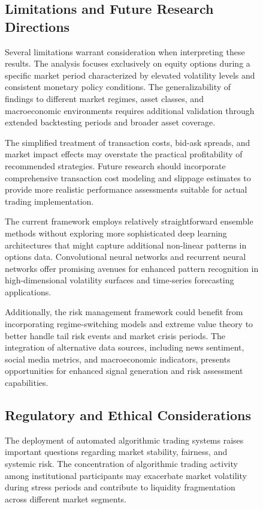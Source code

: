 \documentclass[12pt,a4paper]{article}
\begin{document}
\begin{figure}[H]
\subsection{Limitations and Future Research Directions}

Several limitations warrant consideration when interpreting these results. The analysis focuses exclusively on equity options during a specific market period characterized by elevated volatility levels and consistent monetary policy conditions. The generalizability of findings to different market regimes, asset classes, and macroeconomic environments requires additional validation through extended backtesting periods and broader asset coverage.

The simplified treatment of transaction costs, bid-ask spreads, and market impact effects may overstate the practical profitability of recommended strategies. Future research should incorporate comprehensive transaction cost modeling and slippage estimates to provide more realistic performance assessments suitable for actual trading implementation.

The current framework employs relatively straightforward ensemble methods without exploring more sophisticated deep learning architectures that might capture additional non-linear patterns in options data. Convolutional neural networks and recurrent neural networks offer promising avenues for enhanced pattern recognition in high-dimensional volatility surfaces and time-series forecasting applications.

Additionally, the risk management framework could benefit from incorporating regime-switching models and extreme value theory to better handle tail risk events and market crisis periods. The integration of alternative data sources, including news sentiment, social media metrics, and macroeconomic indicators, presents opportunities for enhanced signal generation and risk assessment capabilities.

\subsection{Regulatory and Ethical Considerations}

The deployment of automated algorithmic trading systems raises important questions regarding market stability, fairness, and systemic risk. The concentration of algorithmic trading activity among institutional participants may exacerbate market volatility during stress periods and contribute to liquidity fragmentation across different market segments.


\end{figure}
\end{document}
